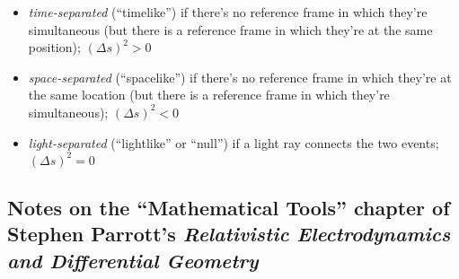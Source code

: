 \documentclass{article}
\begin{document}
\begin{itemize}
    \item \textit{time-separated} (``timelike'') if there's no reference frame in which they're simultaneous (but there is a reference frame in which they're at the same position); $(\Delta s)^2 > 0$
    \item \textit{space-separated} (``spacelike'') if there's no reference frame in which they're at the same location (but there is a reference frame in which they're simultaneous); $(\Delta s)^2 < 0$
    \item \textit{light-separated} (``lightlike'' or ``null'') if a light ray connects the two events; $(\Delta s)^2 = 0$
\end{itemize}

\newpage

\subsection*{Notes on the ``Mathematical Tools'' chapter of Stephen Parrott's \textit{Relativistic Electrodynamics and Differential Geometry}}
\end{document}
